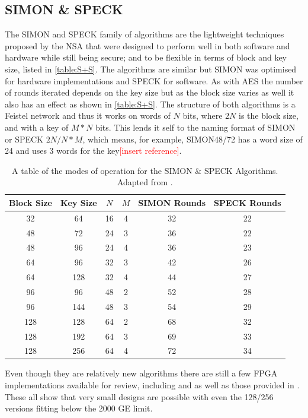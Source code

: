 \documentclass[12pt,twoside,a4paper]{report}
\begin{document}
	\subsection{SIMON \& SPECK}
	The SIMON and SPECK family of algorithms are the lightweight techniques proposed by the NSA that were designed to perform well in both software and hardware while still being secure; and to be flexible in terms of block and key size, listed in \autoref{table:S+S}. The algorithms are similar but SIMON was optimised for hardware implementations and SPECK for software. As with AES the number of rounds iterated depends on the key size but as the block size varies as well it also has an effect as shown in \autoref{table:S+S}. The structure of both algorithms is a Feistel network and thus it works on words of $N$ bits, where $2N$ is the block size, and with a key of $M*N$ bits. This lends it self to the naming format of SIMON or SPECK $2N/N*M$, which means, for example, SIMON48/72 has a word size of 24 and uses 3 words for the key\textcolor{red}{[insert reference]}.
    
	\begin{table}[H]
	\centering
	\begin{tabular}{||c|c|c|c|c|c||}
		\hline \hline
		Block Size & Key Size & $N$ & $M$ & SIMON Rounds & SPECK Rounds \\
		\hline \hline
		32 & 64 & 16 & 4 & 32 & 22 \\
		\hline
		48 & 72 & 24 & 3 & 36 & 22 \\
		48 & 96 & 24 & 4 & 36 & 23 \\
		\hline
		64 & 96 & 32 & 3 & 42 & 26 \\
		64 & 128 & 32 & 4 & 44 & 27 \\
		\hline
		96 & 96 & 48 & 2 & 52 & 28 \\
		96 & 144 & 48 & 3 & 54 & 29 \\
		\hline
		128 & 128 & 64 & 2 & 68 & 32 \\
		128 & 192 & 64 & 3 & 69 & 33 \\
 		128 & 256 & 64 & 4 & 72 & 34 \\
		\hline \hline
	\end{tabular}
	\caption{A table of the modes of operation for the SIMON \& SPECK Algorithms. Adapted from \cite{Beaulieu2015}.}
	\label{table:S+S}
	\end{table}    
    
	Even though they are relatively new algorithms there are still a few FPGA implementations available for review, including \cite{Aysu2014} and \cite{Shahverdi2015} as well as those provided in \cite{Beaulieu2013}. These all show that very small designs are possible with even the 128/256 versions fitting below the 2000 GE limit.
    
\end{document}
